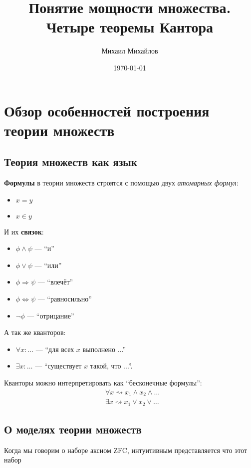 \documentclass{article}
\title{Понятие мощности множества. Четыре теоремы Кантора}
\author{Михаил Михайлов}
\date{\today}
\begin{document}
\maketitle
\tableofcontents

\section{Обзор особенностей построения теории множеств}
\subsection{Теория множеств как язык}
\textbf{Формулы} в теории множеств строятся с помощью двух \textit{атомарных формул}:
\begin{itemize}
    \item \(x = y\)
    \item \(x \in y\)
\end{itemize}
И их \textbf{связок}:
\begin{itemize}
    \item \(\phi \land \psi\) --- \enquote{и}
    \item \(\phi \lor \psi\) --- \enquote{или}
    \item \(\phi \Rightarrow \psi\) --- \enquote{влечёт}
    \item \(\phi \Leftrightarrow \psi\) --- \enquote{равносильно}
    \item \(\neg\phi\) --- \enquote{отрицание}
\end{itemize}
А так же кванторов:
\begin{itemize}
    \item \(\forall x: \ldots\) --- \enquote{для всех $x$ выполнено ...}
    \item \(\exists x: \ldots\) --- \enquote{существует $x$ такой, что ...}.
\end{itemize}
\begin{remark}
    \label{rem:quantifier-relations-basic-operations}
    Кванторы можно интерпретировать как \enquote{бесконечные формулы}:
    \begin{align*}
        &\forall x \rightsquigarrow x_1 \land x_2 \land \ldots \\
        &\exists x \rightsquigarrow x_1 \lor  x_2 \lor  \ldots
    \end{align*}
\end{remark}

\subsection{О моделях теории множеств}
Когда мы говорим о наборе аксиом ZFC, интуитивным представляется что этот набор 
\end{document}
